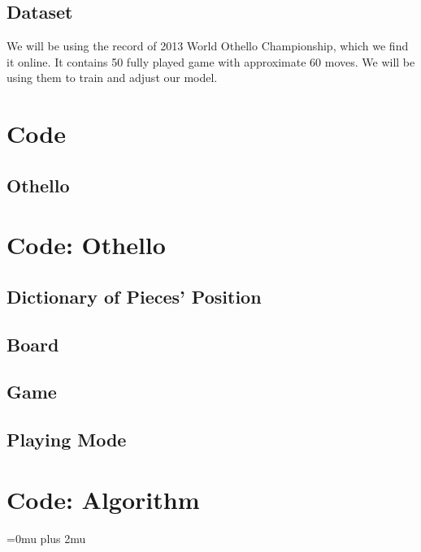 \documentclass[aps,pra,preprint,amsmath,amssymb,floatfix]{revtex4-2}
\begin{document}
\subsection{Dataset}
We will be using the record of 2013 World Othello Championship, which we find it online.\cite{othello_dataset}  It contains 50 fully played game with approximate 60 moves. We will be using them to train and adjust our model.

\section{Code}
\subsection{Othello}



\appendix
\section{Code: Othello}
\subsection{Dictionary of Pieces' Position}

\subsection{Board}

\subsection{Game}

\subsection{Playing Mode}

\section{Code: Algorithm}

\nocite{*}
\Urlmuskip=0mu plus 2mu\relax


\end{document}

